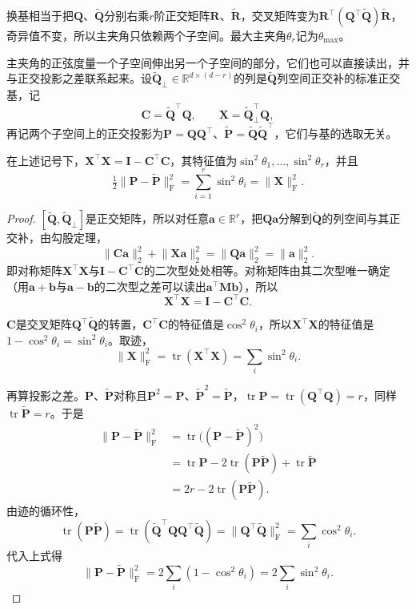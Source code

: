 换基相当于把$\bm Q$、$\widetilde{\bm Q}$分别右乘$r$阶正交矩阵$\bm R$、$\widetilde{\bm R}$，交叉矩阵变为$\bm R^\top(\bm Q^\top\widetilde{\bm Q})\widetilde{\bm R}$，奇异值不变，所以主夹角只依赖两个子空间。最大主夹角$\theta_r$记为$\theta_{\max}$。

主夹角的正弦度量一个子空间伸出另一个子空间的部分，它们也可以直接读出，并与正交投影之差联系起来。设$\widetilde{\bm Q}_\perp\in\mathbb R^{d\times(d-r)}$的列是$\widetilde{\bm Q}$列空间正交补的标准正交基，记
\[
 \bm C=\widetilde{\bm Q}^\top\bm Q,\qquad\bm X=\widetilde{\bm Q}_\perp^\top\bm Q ,
\]
再记两个子空间上的正交投影为$\bm P=\bm Q\bm Q^\top$、$\widetilde{\bm P}=\widetilde{\bm Q}\widetilde{\bm Q}^\top$，它们与基的选取无关。
\begin{theorem}[主夹角的正弦与投影之差]
\label{thm:ls-principal-angle-projection}
在上述记号下，$\bm X^\top\bm X=\bm I-\bm C^\top\bm C$，其特征值为$\sin^2\theta_1,\ldots,\sin^2\theta_r$，并且
\begin{equation}
 \tfrac12\lVert\bm P-\widetilde{\bm P}\rVert_{\mathrm F}^2=\sum_{i=1}^r\sin^2\theta_i=\lVert\bm X\rVert_{\mathrm F}^2 .
 \label{eq:ls-principal-angle-projection}
\end{equation}
\end{theorem}
\begin{proof}
$[\widetilde{\bm Q},\widetilde{\bm Q}_\perp]$是正交矩阵，所以对任意$\bm a\in\mathbb R^r$，把$\bm Q\bm a$分解到$\widetilde{\bm Q}$的列空间与其正交补，由勾股定理，
\[
 \lVert\bm C\bm a\rVert_2^2+\lVert\bm X\bm a\rVert_2^2=\lVert\bm Q\bm a\rVert_2^2=\lVert\bm a\rVert_2^2 .
\]
即对称矩阵$\bm X^\top\bm X$与$\bm I-\bm C^\top\bm C$的二次型处处相等。对称矩阵由其二次型唯一确定（用$\bm a+\bm b$与$\bm a-\bm b$的二次型之差可以读出$\bm a^\top\bm M\bm b$），所以
\[
 \bm X^\top\bm X=\bm I-\bm C^\top\bm C .
\]

$\bm C$是交叉矩阵$\bm Q^\top\widetilde{\bm Q}$的转置，$\bm C^\top\bm C$的特征值是$\cos^2\theta_i$，所以$\bm X^\top\bm X$的特征值是$1-\cos^2\theta_i=\sin^2\theta_i$。取迹，
\[
 \lVert\bm X\rVert_{\mathrm F}^2=\operatorname{tr}(\bm X^\top\bm X)=\sum_i\sin^2\theta_i .
\]

再算投影之差。$\bm P$、$\widetilde{\bm P}$对称且$\bm P^2=\bm P$、$\widetilde{\bm P}^2=\widetilde{\bm P}$，$\operatorname{tr}\bm P=\operatorname{tr}(\bm Q^\top\bm Q)=r$，同样$\operatorname{tr}\widetilde{\bm P}=r$。于是
\[
 \begin{aligned}
 \lVert\bm P-\widetilde{\bm P}\rVert_{\mathrm F}^2
 &=\operatorname{tr}\bigl((\bm P-\widetilde{\bm P})^2\bigr)\\
 &=\operatorname{tr}\bm P-2\operatorname{tr}(\bm P\widetilde{\bm P})+\operatorname{tr}\widetilde{\bm P}\\
 &=2r-2\operatorname{tr}(\bm P\widetilde{\bm P}).
 \end{aligned}
\]
由迹的循环性，
\[
 \operatorname{tr}(\bm P\widetilde{\bm P})=\operatorname{tr}(\widetilde{\bm Q}^\top\bm Q\bm Q^\top\widetilde{\bm Q})=\lVert\bm Q^\top\widetilde{\bm Q}\rVert_{\mathrm F}^2=\sum_i\cos^2\theta_i .
\]
代入上式得
\[
 \lVert\bm P-\widetilde{\bm P}\rVert_{\mathrm F}^2=2\sum_i(1-\cos^2\theta_i)=2\sum_i\sin^2\theta_i .
\]
\end{proof}
